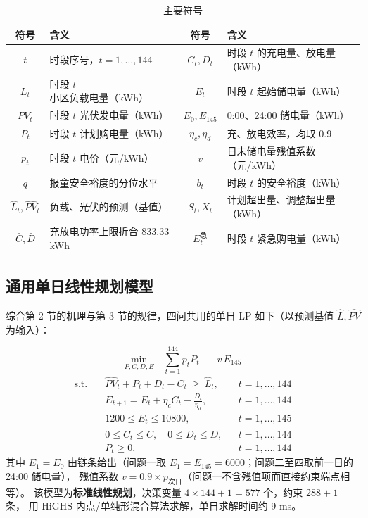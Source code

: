 \documentclass[12pt,a4paper,fontset=fandol]{ctexart}
\begin{document}
\begin{table}[htbp]
\centering
\caption{主要符号}
\label{tab:symbols}
\begin{tabular}{@{}clcl@{}}
\toprule
符号 & 含义 & 符号 & 含义 \\
\midrule
$t$ & 时段序号\nobreak，$t=1,\dots,144$ & $C_t,D_t$ & 时段 $t$ 的充电量\nobreak、放电量（kWh\nobreak）\\
$L_t$ & 时段 $t$ 小区负载电量（kWh\nobreak） & $E_t$ & 时段 $t$ 起始储电量（kWh\nobreak）\\
$PV_t$ & 时段 $t$ 光伏发电量（kWh\nobreak） & $E_0,E_{145}$ & 0:00\nobreak、24:00 储电量（kWh\nobreak）\\
$P_t$ & 时段 $t$ 计划购电量（kWh\nobreak） & $\eta_c,\eta_d$ & 充\nobreak、放电效率\nobreak，均取 0.9\\
$p_t$ & 时段 $t$ 电价（元/kWh\nobreak） & $v$ & 日末储电量残值系数（元/kWh\nobreak）\\
$q$ & 报童安全裕度的分位水平 & $b_t$ & 时段 $t$ 的安全裕度（kWh\nobreak）\\
$\hat L_t,\hat{PV}_t$ & 负载\nobreak、光伏的预测（基值\nobreak） & $S_t,X_t$ & 计划超出量\nobreak、调整超出量（kWh\nobreak）\\
$\bar C,\bar D$ & 充放电功率上限折合 833.33 kWh & $E_t^{\text{急}}$ & 时段 $t$ 紧急购电量（kWh\nobreak）\\
\bottomrule
\end{tabular}
\end{table}

\subsection{通用单日线性规划模型}

综合第 2 节的机理与第 3 节的规律\nobreak，四问共用的单日 LP 如下（以预测基值 $\hat L,\hat{PV}$ 为输入\nobreak）\nobreak：

\begin{equation}
\underset{P,C,D,E}{\text{min}}\quad \sum_{t=1}^{144} p_t P_t \;-\; v\,E_{145}
\label{eq:obj}
\end{equation}
\begin{align}
\text{s.t.}\quad & \hat{PV}_t + P_t + D_t - C_t \ \ge\ \hat L_t, && t=1,\dots,144 \label{eq:c1}\\
& E_{t+1} = E_t + \eta_c C_t - \frac{D_t}{\eta_d}, && t=1,\dots,144 \label{eq:c2}\\
& 1200 \le E_t \le 10800, && t=1,\dots,145 \label{eq:c3}\\
& 0 \le C_t \le \bar C,\quad 0 \le D_t \le \bar D, && t=1,\dots,144 \label{eq:c4}\\
& P_t \ge 0, && t=1,\dots,144 \label{eq:c5}
\end{align}
其中 $E_1=E_0$ 由链条给出（问题一取 $E_1=E_{145}=6000$\nobreak；问题二至四取前一日的 24:00 储电量\nobreak）\nobreak，
残值系数 $v=0.9\times\bar p_{\text{次日}}$（问题一不含残值项而直接约束端点相等\nobreak）\nobreak。
该模型为\textbf{标准线性规划}\nobreak，决策变量 $4\times144+1=577$ 个\nobreak，约束 $288+1$ 条\nobreak，
用 HiGHS 内点/单纯形混合算法求解\nobreak，单日求解时间约 9 ms\nobreak。
\end{document}
